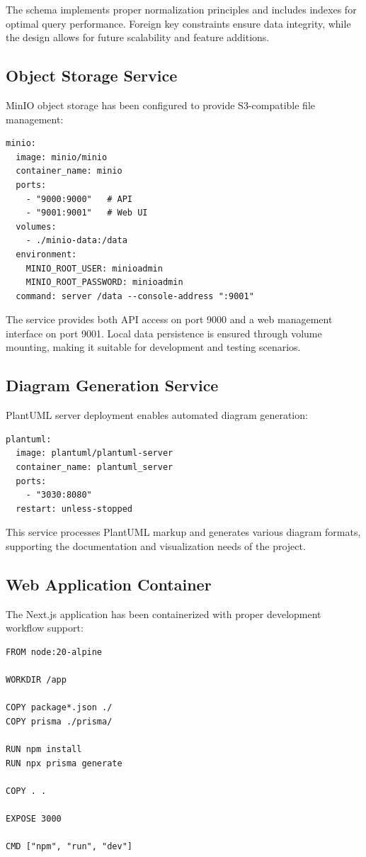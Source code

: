 The schema implements proper normalization principles and includes indexes for optimal query performance. Foreign key constraints ensure data integrity, while the design allows for future scalability and feature additions.

\subsection{Object Storage Service}

MinIO object storage has been configured to provide S3-compatible file management:

\begin{verbatim}
minio:
  image: minio/minio
  container_name: minio
  ports:
    - "9000:9000"   # API
    - "9001:9001"   # Web UI
  volumes:
    - ./minio-data:/data
  environment:
    MINIO_ROOT_USER: minioadmin
    MINIO_ROOT_PASSWORD: minioadmin
  command: server /data --console-address ":9001"
\end{verbatim}

The service provides both API access on port 9000 and a web management interface on port 9001. Local data persistence is ensured through volume mounting, making it suitable for development and testing scenarios.

\subsection{Diagram Generation Service}

PlantUML server deployment enables automated diagram generation:

\begin{verbatim}
plantuml:
  image: plantuml/plantuml-server
  container_name: plantuml_server
  ports:
    - "3030:8080"
  restart: unless-stopped
\end{verbatim}

This service processes PlantUML markup and generates various diagram formats, supporting the documentation and visualization needs of the project.

\subsection{Web Application Container}

The Next.js application has been containerized with proper development workflow support:

\begin{verbatim}
FROM node:20-alpine

WORKDIR /app

COPY package*.json ./
COPY prisma ./prisma/

RUN npm install
RUN npx prisma generate

COPY . .

EXPOSE 3000

CMD ["npm", "run", "dev"]
\end{verbatim}

